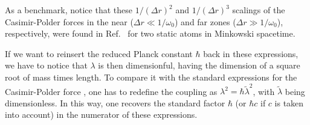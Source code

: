 \documentclass[twocolumn,prd,aps,showpacs,amsmath,amssymb]{revtex4-1}
\begin{document}
As a benchmark, notice that these $1/(\Delta r)^2$ and $1/(\Delta r)^3$
scalings of the Casimir-Polder forces in the near ($\Delta
r\ll1/\omega_0$) and far zones ($\Delta r\gg1/\omega_0$),
respectively, were found
in Ref.~\cite{marino} for two static atoms in Minkowski
spacetime.  

If we want to reinsert the reduced Planck constant $\hbar$ back in these expressions, we have to
notice that $\lambda$ is then dimensionful, having the dimension of a
square root of mass times length. To compare it with the standard
expressions for the Casimir-Polder force \cite{CP48}, one has to
redefine the coupling as $\lambda^2=\hbar\tilde{\lambda}^2$, with
$\tilde{\lambda}$ being dimensionless. In this way, one recovers the
standard factor $\hbar$ (or $\hbar c$ if $c$ is taken into account) in
the numerator of these expressions.
\end{document}
